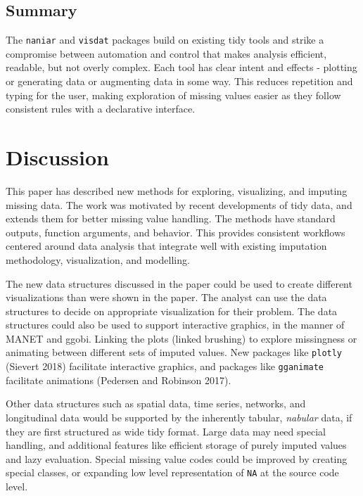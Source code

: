 \documentclass[]{article}
\theoremstyle{definition}
\theoremstyle{definition}
\theoremstyle{definition}
\theoremstyle{remark}
\begin{document}
\hypertarget{case-study-summary}{%
\subsection{Summary}\label{case-study-summary}}

The \texttt{naniar} and \texttt{visdat} packages build on existing tidy
tools and strike a compromise between automation and control that makes
analysis efficient, readable, but not overly complex. Each tool has
clear intent and effects - plotting or generating data or augmenting
data in some way. This reduces repetition and typing for the user,
making exploration of missing values easier as they follow consistent
rules with a declarative interface.

\hypertarget{discussion}{%
\section{Discussion}\label{discussion}}

This paper has described new methods for exploring, visualizing, and
imputing missing data. The work was motivated by recent developments of
tidy data, and extends them for better missing value handling. The
methods have standard outputs, function arguments, and behavior. This
provides consistent workflows centered around data analysis that
integrate well with existing imputation methodology, visualization, and
modelling.

The new data structures discussed in the paper could be used to create
different visualizations than were shown in the paper. The analyst can
use the data structures to decide on appropriate visualization for their
problem. The data structures could also be used to support interactive
graphics, in the manner of MANET and ggobi. Linking the plots (linked
brushing) to explore missingness or animating between different sets of
imputed values. New packages like \texttt{plotly} (Sievert 2018)
facilitate interactive graphics, and packages like \texttt{gganimate}
facilitate animations (Pedersen and Robinson 2017).

Other data structures such as spatial data, time series, networks, and
longitudinal data would be supported by the inherently tabular,
\emph{nabular} data, if they are first structured as wide tidy format.
Large data may need special handling, and additional features like
efficient storage of purely imputed values and lazy evaluation. Special
missing value codes could be improved by creating special classes, or
expanding low level representation of \texttt{NA} at the source code
level.
\end{document}
